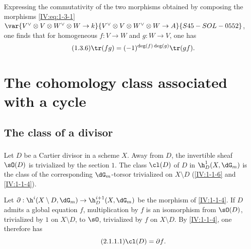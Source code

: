 Expressing the commutativity of the two morphisms obtained by composing the
morphisms \eqref{IV:eq:1-3-1}
$\var{V^\vee\otimes V\otimes W^\vee\otimes W\to k}{V^\vee\otimes V\otimes W^\vee\otimes W\to A}{S45-SOL-0552}$, one finds that for homogeneous
$f:V\to W$ and $g:W\to V$, one has
\begin{equation*}\tag{1.3.6}\label{IV:eq:1-3-6}
  \tr(f g) = (-1)^{\deg(f)\deg(g)} \tr(g f) \text{.}
\end{equation*}




















\section{The cohomology class associated with a cycle}\label{IV:2}










\subsection{The class of a divisor}\label{IV:2-1}






\subsubsection{}\label{IV:2-1-1}

Let $D$ be a Cartier divisor in a scheme $X$. Away from $D$, the invertible
sheaf $\sO(D)$ is trivialized by the section $1$. The class $\cl(D)$ of $D$
in $\h_D^1(X,\dG_m)$ is the class of the corresponding $\dG_m$-torsor
trivialized on $X\setminus D$ (\ref{IV:1-1-6} and \ref{IV:1-1-4}).

Let $\partial:\h^i(X\setminus D,\dG_m)\to \h_D^{i+1}(X,\dG_m)$ be the morphism
of \ref{IV:1-1-4}. If $D$ admits a global equation $f$, multiplication by
$f$ is an isomorphism from $\sO(D)$, trivialized by $1$ on $X\setminus D$,
to $\sO$, trivialized by $f$ on $X\setminus D$. By \ref{IV:1-1-4}, one
therefore has
\begin{equation*}\tag{2.1.1.1}\label{IV:eq:2-1-1}
  \cl(D) = \partial f \text{.}
\end{equation*}

